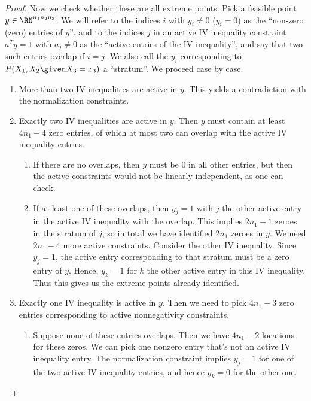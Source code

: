 \begin{proof}
  Now we check whether these are all extreme points.
  Pick a feasible point $y \in \RN^{n_1n_2n_3}$.
  We will refer to the indices $i$ with $y_i \ne 0$ ($y_i = 0$) as the ``non-zero (zero) entries of $y$'', and to the indices $j$ in an active IV inequality constraint $a^T y = 1$ with $a_j \ne 0$ as the ``active entries of the IV inequality'', and say that two such entries overlap if $i=j$.
  We also call the $y_i$ corresponding to $P(X_1,X_2\given X_3=x_3)$ a ``stratum''.
  We proceed case by case.
  \begin{enumerate}
    \item More than two IV inequalities are active in $y$.
      This yields a contradiction with the normalization constraints.
    \item Exactly two IV inequalities are active in $y$. 
      Then $y$ must contain at least $4n_1-4$ zero entries, of which at most two can overlap with the active IV inequality entries.
      \begin{enumerate}
        \item If there are no overlaps, then $y$ must be 0 in all other entries, but then the active constraints would not be linearly independent, as one can check.
        \item If at least one of these overlaps, 
          then $y_j=1$ with $j$ the other active entry in the active IV inequality with the overlap.
          This implies $2n_1-1$ zeroes in the stratum of $j$, so in total we have identified $2n_1$ zeroes in $y$.
          We need $2n_1-4$ more active constraints. 
          Consider the other IV inequality. 
          Since $y_j=1$, the active entry corresponding to that stratum must be a zero entry of $y$. 
          Hence, $y_k=1$ for $k$ the other active entry in this IV inequality.
          Thus this gives us the extreme points already identified.
      \end{enumerate}
    \item Exactly one IV inequality is active in $y$. 
      Then we need to pick $4n_1-3$ zero entries corresponding to active nonnegativity constraints. 
      \begin{enumerate}
        \item Suppose none of these entries overlaps.
          Then we have $4n_1-2$ locations for these zeros. 
          We can pick one nonzero entry that's not an active IV inequality entry.
          The normalization constraint implies $y_j=1$ for one of the two active IV inequality entries, and hence $y_k=0$ for the other one. 

\end{enumerate}
\end{enumerate}
\end{proof}
